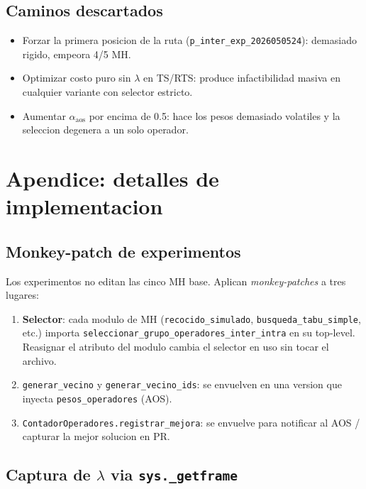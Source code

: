 \documentclass[11pt,a4paper]{article}
\newcommand{\mh}{MH}
\newcommand{\code}[1]{\texttt{#1}}
\begin{document}
\subsection{Caminos descartados}

\begin{itemize}
\item Forzar la primera posicion de la ruta
(\texttt{p\_inter\_exp\_2026050524}): demasiado rigido,
empeora 4/5 \mh.
\item Optimizar costo puro sin $\lambda$ en TS/RTS: produce
infactibilidad masiva en cualquier variante con selector estricto.
\item Aumentar $\alpha_{\text{aos}}$ por encima de 0.5: hace los
pesos demasiado volatiles y la seleccion degenera a un solo operador.
\end{itemize}

\section{Apendice: detalles de implementacion}\label{sec:apendice}

\subsection{Monkey-patch de experimentos}

Los experimentos no editan las cinco \mh{} base. Aplican
\emph{monkey-patches} a tres lugares:
\begin{enumerate}
\item \textbf{Selector}: cada modulo de \mh{} (\code{recocido\_simulado},
\code{busqueda\_tabu\_simple}, etc.) importa
\code{seleccionar\_grupo\_operadores\_inter\_intra} en su top-level.
Reasignar el atributo del modulo cambia el selector en uso sin
tocar el archivo.
\item \code{generar\_vecino} y \code{generar\_vecino\_ids}: se envuelven
en una version que inyecta \code{pesos\_operadores} (AOS).
\item \code{ContadorOperadores.registrar\_mejora}: se envuelve para
notificar al AOS / capturar la mejor solucion en PR.
\end{enumerate}

\subsection{Captura de $\lambda$ via \code{sys.\_getframe}}
\end{document}
